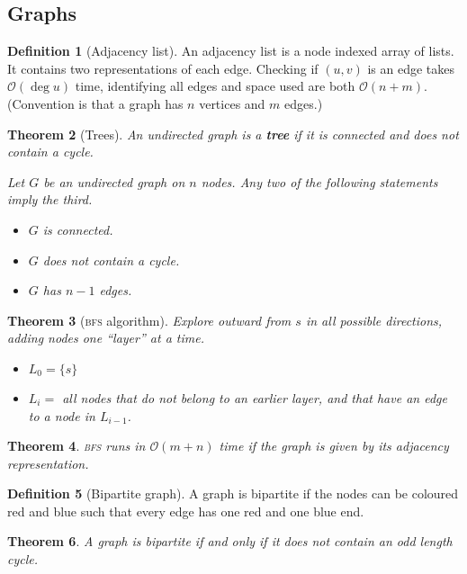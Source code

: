 \documentclass[10pt, oneside, reqno]{amsart}
\theoremstyle{plain}%
\newtheorem{thm}{Theorem}[section]
\theoremstyle{definition}
\newtheorem{defn}[thm]{Definition}
\theoremstyle{remark}
\newcommand{\bigo}[1]{\mathcal{O}(#1)}
\begin{document}
\subsection{Graphs} %
\label{sub:graphs}

\begin{defn}[Adjacency list]
	An adjacency list is a node indexed array of lists.  It contains two representations of each edge.  Checking if $(u,v)$ is an edge takes $\bigo{\deg u}$ time, identifying all edges and space used are both $\bigo{n+m}$.  (Convention is that a graph has $n$ vertices and $m$ edges.)
\end{defn}

\begin{thm}[Trees]
	An undirected graph is a \textbf{tree} if it is connected and does not contain a cycle.  
	
	Let $G$ be an undirected graph on $n$ nodes. Any two of the following statements imply the third.
	\begin{itemize}
		\item $G$ is connected.
		\item $G$ does not contain a cycle.
		\item $G$ has $n-1$ edges.
	\end{itemize}
\end{thm}


\begin{thm}[\textsc{bfs} algorithm]
	Explore outward from $s$ in all possible directions, adding nodes one ``layer'' at a time.  
	\begin{itemize}
		\item $L_0 = \{s\}$
		\item $L_{i} = $ all nodes that do not belong to an earlier layer, and that have an edge to a node in $L_{i-1}$.
	\end{itemize}
\end{thm}

\begin{thm}
	\textsc{bfs} runs in $\bigo{m+n}$ time if the graph is given by its adjacency representation.
\end{thm}

\begin{defn}[Bipartite graph]
	A graph is bipartite if the nodes can be coloured red and blue such that every edge has one red and one blue end.
\end{defn}

\begin{thm}
	A graph is bipartite if and only if it does not contain an odd length cycle.
\end{thm}
\end{document}
